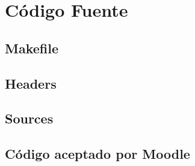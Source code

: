 \documentclass[10pt,executivepaper]{article}
\begin{document}
  \section{Código Fuente}
  \subsection{Makefile}
  
  \subsection{Headers}
  \begin{center}
    
    
  \end{center}
  \subsection{Sources}
  \begin{center}
    
    
  \end{center}
  \subsection{Código aceptado por Moodle}
  \begin{center}
    
  \end{center}
\end{document}
